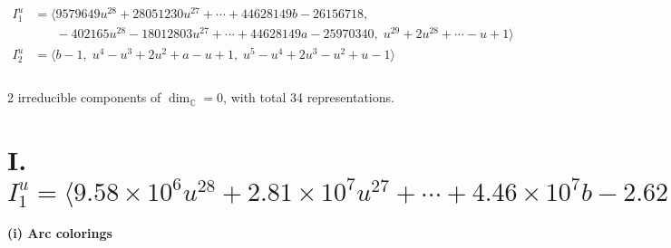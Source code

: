 \documentclass[1p]{elsarticle_modified}
\theoremstyle{definition}
\begin{document}
\begin{align*}
I^u_{1}&=\langle 
9579649 u^{28}+28051230 u^{27}+\cdots+44628149 b-26156718,\\
\phantom{I^u_{1}}&\phantom{= \langle  }-402165 u^{28}-18012803 u^{27}+\cdots+44628149 a-25970340,\;u^{29}+2 u^{28}+\cdots- u+1\rangle \\
I^u_{2}&=\langle 
b-1,\;u^4- u^3+2 u^2+a- u+1,\;u^5- u^4+2 u^3- u^2+u-1\rangle \\
\\
\end{align*}
\raggedright * 2 irreducible components of $\dim_{\mathbb{C}}=0$, with total 34 representations.\\
\newpage
\renewcommand{\arraystretch}{1}
\centering \section*{I. $I^u_{1}= \langle 9.58\times10^{6} u^{28}+2.81\times10^{7} u^{27}+\cdots+4.46\times10^{7} b-2.62\times10^{7},\;-4.02\times10^{5} u^{28}-1.80\times10^{7} u^{27}+\cdots+4.46\times10^{7} a-2.60\times10^{7},\;u^{29}+2 u^{28}+\cdots- u+1 \rangle$}
\flushleft \textbf{(i) Arc colorings}\\
\end{document}
